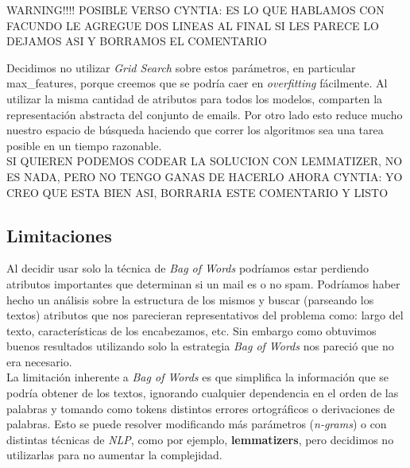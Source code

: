 {\Large WARNING!!!! POSIBLE VERSO
CYNTIA: ES LO QUE HABLAMOS CON FACUNDO LE AGREGUE DOS LINEAS AL FINAL SI LES PARECE LO DEJAMOS ASI Y BORRAMOS EL COMENTARIO}

Decidimos no utilizar \textit{Grid Search} sobre estos parámetros, en particular max\_features, porque creemos que se podría caer en \textit{overfitting} fácilmente. Al utilizar la misma cantidad de atributos para todos los modelos, comparten la representación abstracta del conjunto de emails. Por otro lado esto reduce mucho nuestro espacio de búsqueda haciendo que correr los algoritmos sea una tarea posible en un tiempo razonable.\\

{\Large SI QUIEREN PODEMOS CODEAR LA SOLUCION CON LEMMATIZER, NO ES NADA, PERO NO TENGO GANAS DE HACERLO AHORA
CYNTIA: YO CREO QUE ESTA BIEN ASI, BORRARIA ESTE COMENTARIO Y LISTO}
\subsection{Limitaciones}

Al decidir usar solo la técnica de \textit{Bag of Words} podríamos estar perdiendo atributos importantes que determinan si un mail es o no spam. Podríamos haber hecho un análisis sobre la estructura de los mismos y buscar (parseando los textos) atributos que nos parecieran representativos del problema como: largo del texto, características de los encabezamos, etc. Sin embargo como obtuvimos buenos resultados utilizando solo la estrategia \textit{Bag of Words} nos pareció que no era necesario.   \\

La limitación inherente a \textit{Bag of Words} es que simplifica la información que se podría obtener de los textos, ignorando cualquier dependencia en el orden de las palabras y tomando como tokens distintos errores ortográficos o derivaciones de palabras. Esto se puede resolver modificando más parámetros (\textit{n-grams}) o con distintas técnicas de \textit{NLP}, como por ejemplo, \textbf{lemmatizers}, pero decidimos no utilizarlas para no aumentar la complejidad.
